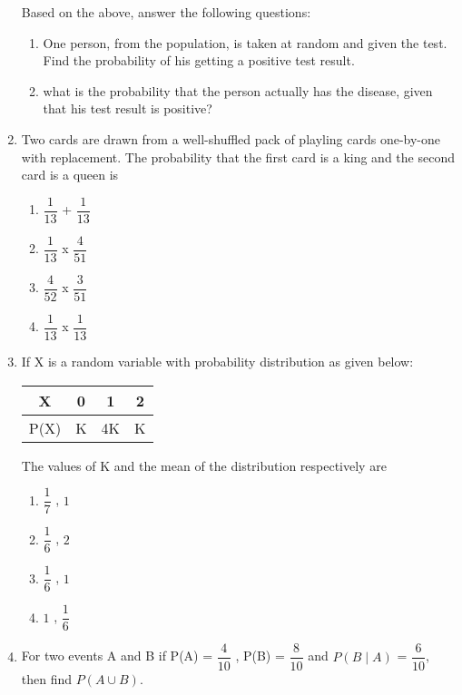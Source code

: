 \documentclass[a4paper,12pt]{article}
\begin{document}
\begin{enumerate}
Based on the above, answer the following questions:\
\begin{enumerate}
\item One person, from the population, is taken at random and  given the test. Find the probability of his getting a positive test result.

\item what is the probability that the person actually has the disease, given that his test result is positive?
\end{enumerate}

\item Two cards are drawn from a well-shuffled pack of playling cards one-by-one with replacement. The probability that the first card is a king and the second card is a queen is 

\begin{enumerate}
\item $\dfrac{1}{13}$ + $\dfrac{1}{13}$
\item $\dfrac{1}{13}$ x $\dfrac{4}{51}$
\item $\dfrac{4}{52}$ x $\dfrac{3}{51}$
\item $\dfrac{1}{13}$ x $\dfrac{1}{13}$
\end{enumerate}

\item If X is a random variable with probability distribution as given below:\\
\begin{table}[ht]
\centering	
\begin{tabular}{|c|c|c|c|}
\hline
X & 0 & 1 & 2 \\
\hline
P(X) & K & 4K & K \\
\hline
\end{tabular}

\end{table}

The values  of K and the mean of the distribution respectively are\\
\begin{enumerate}
\item  $\dfrac{1}{7}$ , $1$
\item  $\dfrac{1}{6}$ , $2$
\item  $\dfrac{1}{6}$ , $1$
\item  $1$ , $\dfrac{1}{6}$
\end{enumerate}

\item For two events A and B if P(A) = $\dfrac{4}{10}$ , P(B) = $\dfrac{8}{10}$ and $P(B\mid A)$ = $\dfrac{6}{10}$, then find $P(A \cup B)$.


\end{enumerate}
\end{document}
